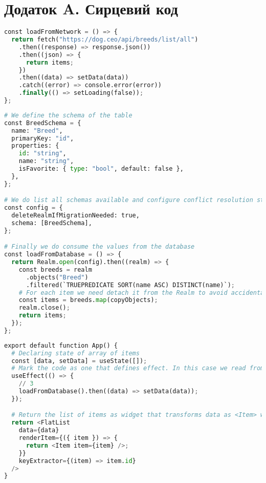 \appendix
\chapter*{Додаток A. Сирцевий код}
\label{cha:appendix1}

\begin{lstlisting}[style=light, language=Python,label={lst:rn_network},caption=React Native Network Call]
const loadFromNetwork = () => {
  return fetch("https://dog.ceo/api/breeds/list/all")
    .then((response) => response.json())
    .then((json) => {
      return items;
    })
    .then((data) => setData(data))
    .catch((error) => console.error(error))
    .finally(() => setLoading(false));
};
\end{lstlisting}

\begin{lstlisting}[style=light, language=Python,label={lst:rn_realm},caption=React Native Realm]
# We define the schema of the table
const BreedSchema = {
  name: "Breed",
  primaryKey: "id",
  properties: {
    id: "string",
    name: "string",
    isFavorite: { type: "bool", default: false },
  },
};

# We do list all schemas available and configure conflict resolution strategy
const config = {
  deleteRealmIfMigrationNeeded: true,
  schema: [BreedSchema],
};

# Finally we do consume the values from the database
const loadFromDatabase = () => {
  return Realm.open(config).then((realm) => {
    const breeds = realm
      .objects("Breed")
      .filtered(`TRUEPREDICATE SORT(name ASC) DISTINCT(name)`);
    # For each item we need detach it from the Realm to avoid accidental mutations
    const items = breeds.map(copyObjects);
    realm.close();
    return items;
  });
};
\end{lstlisting}

\begin{lstlisting}[style=light, language=Python,label={lst:rn_state_hooks},caption=React Native Hooks]
export default function App() {
  # Declaring state of array of items
  const [data, setData] = useState([]);
  # Mark the code as one that defines effect. In this case we read from DB.
  useEffect(() => {
    // 3
    loadFromDatabase().then((data) => setData(data));
  });

  # Return the list of items as widget that transforms data as <Item> widget
  return <FlatList
    data={data}
    renderItem={({ item }) => {
      return <Item item={item} />;
    }}
    keyExtractor={(item) => item.id}
  />
}
\end{lstlisting}


